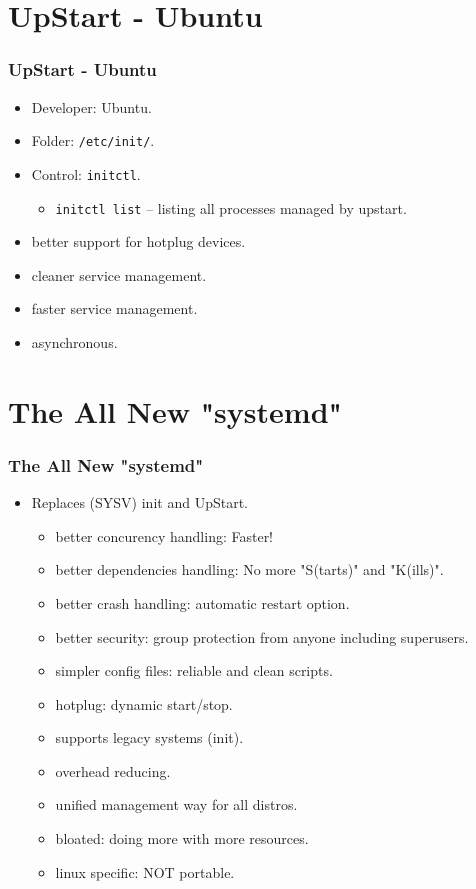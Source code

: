 \documentclass[aspectratio=169, xcolor=table, notheorems, hyperref={pdfpagelabels=false}]{beamer}
\begin{document}
\section{UpStart - Ubuntu}
\begin{frame}
\frametitle{UpStart - Ubuntu}
\begin{itemize}
\item Developer: Ubuntu.
\item Folder: \texttt{/etc/init/}.
\item Control: \texttt{initctl}.
\begin{itemize}
\item \texttt{initctl list} -- listing all processes managed by upstart.
\end{itemize}
\item better support for hotplug devices.
\item cleaner service management.
\item faster service management.
\item asynchronous.
\end{itemize}
\end{frame}

\section{The All New "systemd"}
\begin{frame}
\frametitle{The All New "systemd"}
\begin{itemize}
\item Replaces (SYSV) init and UpStart.
\begin{itemize}
\item better concurency handling: Faster!
\item better dependencies handling: No more "S(tarts)" and "K(ills)".
\item better crash handling: automatic restart option.
\item better security: group protection from anyone including superusers.
\item simpler config files: reliable and clean scripts.
\item hotplug: dynamic start/stop.
\item supports legacy systems (init).
\item overhead reducing.
\item unified management way for all distros.
\item bloated: doing more with more resources.
\item linux specific: NOT portable.
\end{itemize}
\end{itemize}
\end{frame}
\end{document}
